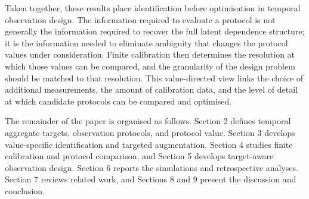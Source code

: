 Taken together, these results place identification before optimisation in temporal observation design. The information required to evaluate a protocol is not generally the information required to recover the full latent dependence structure; it is the information needed to eliminate ambiguity that changes the protocol values under consideration. Finite calibration then determines the resolution at which those values can be compared, and the granularity of the design problem should be matched to that resolution. This value-directed view links the choice of additional measurements, the amount of calibration data, and the level of detail at which candidate protocols can be compared and optimised.


The remainder of the paper is organised as follows. Section 2 defines temporal aggregate targets, observation protocols, and protocol value. Section 3 develops value-specific identification and targeted augmentation. Section 4 studies finite calibration and protocol comparison, and Section 5 develops target-aware observation design. Section 6 reports the simulations and retrospective analyses. Section 7 reviews related work, and Sections 8 and 9 present the discussion and conclusion.
